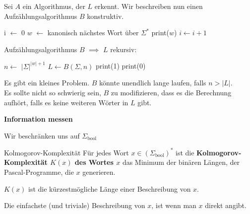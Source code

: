 \documentclass[a4paper, 11pt]{article}
\newcommand\myTitle[1]{{\large \textbf {#1}}}
\begin{document}
        Sei $A$ ein Algorithmus, der $L$ erkennt. Wir beschreiben nun einen Aufzählungsalgorithmus $B$ konstruktiv. 
    
        \begin{algorithm}[H]
            \caption{$B(\Sigma, n)$}
            \begin{algorithmic}
                \State i $\leftarrow$ 0
                    \State $w$ $\leftarrow$ kanonisch nächstes Wort über $\Sigma^*$
                    \State print($w$)
                    \State $i \leftarrow i + 1$
                    \EndIf 
                \EndWhile
            \end{algorithmic}
        \end{algorithm}
    
        Aufzählungsalgorithmus $B$ $\implies$ $L$ rekursiv:
    
        \begin{algorithm}[H]
            \caption{$A(\Sigma, w)$}
            \begin{algorithmic}
                \State$n \leftarrow$ $|\Sigma|^{|w| + 1}$
                \State $L \leftarrow B(\Sigma, n)$
                \State print(1)
                \Else
                \State print(0)
                \EndIf
            \end{algorithmic}
        \end{algorithm}
        Es gibt ein kleines Problem. $B$ könnte unendlich lange laufen, falls $n > |L|$.\\ 
        Es sollte nicht so schwierig sein, $B$ zu modifizieren, dass es die Berechnung aufhört, falls es keine weiteren Wörter in $L$ gibt.
    
    
    
        \myTitle{Information messen}

        Wir beschränken uns auf $\Sigma_{\text{bool}}$
        \begin{mainbox}{Kolmogorov-Komplexität}
            Für jedes Wort $x \in (\Sigma_{\text{bool}})^*$ ist die \textbf{Kolmogorov-Komplexität $K(x)$ des Wortes $x$} das Minimum der binären Längen, der Pascal-Programme, die $x$ generieren.
        \end{mainbox}
        $K(x)$ ist die kürzestmögliche Länge einer Beschreibung von $x$.
    
        Die einfachste (und triviale) Beschreibung von $x$, ist wenn man $x$ direkt angibt.
    
\end{document}
